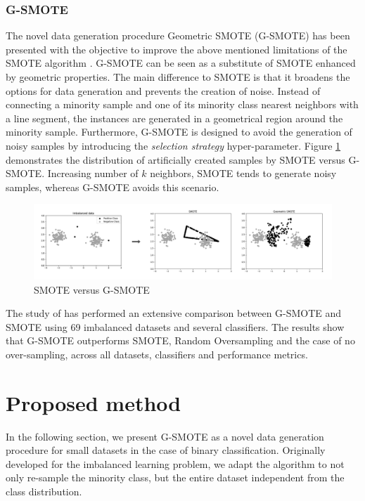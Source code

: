 \documentclass[parskip=full]{scrartcl}
\begin{document}
\subsubsection{G-SMOTE}

The novel data generation procedure Geometric SMOTE (G-SMOTE) has been presented
with the objective to improve the above mentioned limitations of the SMOTE
algorithm \cite{Douzas.2019b}. G-SMOTE can be seen as a substitute of SMOTE
enhanced by geometric properties. The main difference to SMOTE is that it
broadens the options for data generation and prevents the creation of noise.
Instead of connecting a minority sample and one of its minority class nearest
neighbors with a line segment, the instances are generated in a geometrical
region around the minority sample. Furthermore, G-SMOTE is designed to avoid the
generation of noisy samples by introducing the \textit{selection strategy}
hyper-parameter. Figure \ref{fig:smotevsgsmote} demonstrates the distribution of
artificially created samples by SMOTE versus G-SMOTE. Increasing number of
$\mathit{k}$ neighbors, SMOTE tends to generate noisy samples, whereas G-SMOTE
avoids this scenario.

\begin{figure}[H]
	\centering
	\includegraphics[width=1\linewidth]{../analysis/smote_vs_gsmote}
	\caption{SMOTE versus G-SMOTE \cite{Douzas.2019}}
	\label{fig:smotevsgsmote}
\end{figure}

The study of \cite{Douzas.2019b} has performed an extensive comparison between
G-SMOTE and SMOTE using 69 imbalanced datasets and several classifiers. The
results show that G-SMOTE outperforms SMOTE, Random Oversampling and the case of
no over-sampling, across all datasets, classifiers and performance metrics.

\section{Proposed method}

In the following section, we present G-SMOTE as a novel data generation
procedure for small datasets in the case of binary classification. Originally
developed for the imbalanced learning problem, we adapt the algorithm to not
only re-sample the minority class, but the entire dataset independent from the
class distribution. 
\end{document}

